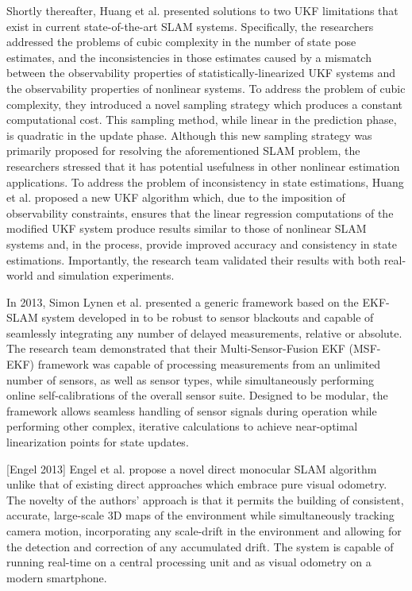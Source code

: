 Shortly thereafter, Huang et al. \cite{Huang2013} presented solutions to two UKF limitations that exist in current state-of-the-art SLAM systems. Specifically, the researchers addressed the problems of cubic complexity in the number of state pose estimates, and the inconsistencies in those estimates caused by a mismatch between the observability properties of statistically-linearized UKF systems and the observability properties of nonlinear systems. To address the problem of cubic complexity, they introduced a novel sampling strategy which produces a constant computational cost. This sampling method, while linear in the prediction phase, is quadratic in the update phase. Although this new sampling strategy was primarily proposed for resolving the aforementioned SLAM problem, the researchers stressed that it has potential usefulness in other nonlinear estimation applications. To address the problem of inconsistency in state estimations, Huang et al. proposed a new UKF algorithm which, due to the imposition of observability constraints, ensures that the linear regression computations of the modified UKF system produce results similar to those of nonlinear SLAM systems and, in the process, provide improved accuracy and consistency in state estimations. Importantly, the research team validated their results with both real-world and simulation experiments.

In 2013, Simon Lynen et al. \cite{Lynen2013} presented a generic framework based on the EKF-SLAM system developed in \cite{Weiss2012} to be robust to sensor blackouts and capable of seamlessly integrating any number of delayed measurements, relative or absolute. The research team demonstrated that their Multi-Sensor-Fusion EKF (MSF-EKF) framework was capable of processing measurements from an unlimited number of sensors, as well as sensor types, while simultaneously performing online self-calibrations of the overall sensor suite. Designed to be modular, the framework allows seamless handling of sensor signals during operation while performing other complex, iterative calculations to achieve near-optimal linearization points for state updates.

[Engel 2013] Engel et al. propose a novel direct monocular SLAM algorithm unlike that of existing direct approaches which embrace pure visual odometry. The novelty of the authors' approach is that it permits the building of consistent, accurate, large-scale 3D maps of the environment while simultaneously tracking camera motion, incorporating any scale-drift in the environment and allowing for the detection and correction of any accumulated drift. The system is capable of running real-time on a central processing unit and as visual odometry on a modern smartphone.

